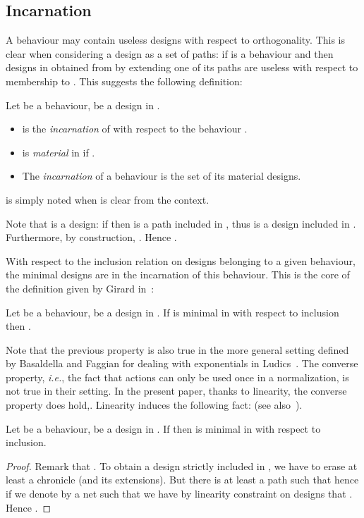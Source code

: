 \documentclass{LMCS}
\def\ie{{\em i.e.}}
\begin{document}
\subsection{Incarnation}

A behaviour may contain useless designs with respect to orthogonality. This is clear when considering a design as a set of paths:  if  is a behaviour and  then designs in  obtained from  by extending one of its paths are useless with respect to membership to . This suggests the following definition:

\begin{defi}[Incarnation]\label{incarnationdessein}
Let  be a behaviour,  be a design in . 
\begin{itemize}
\item  is the {\em incarnation} of  with respect to the behaviour . 
\item  is {\em material} in  if .
\item The {\em incarnation}  of a behaviour  is the  set of its material designs.
\end{itemize}
 is simply noted  when  is clear from the context.
\end{defi}

Note that  is a design: if  then 
 is a path included in , thus  is a design included in . 
Furthermore, by construction, . Hence .


 With respect to the inclusion relation on designs belonging to a given behaviour, the minimal designs are in the incarnation of this behaviour.
This is the core of the definition given by Girard in~\cite{DBLP:journals/mscs/Girard01}:
\begin{prop}
Let  be a behaviour,  be a design in .
If  is minimal in  with respect to inclusion then .
\end{prop}

Note that the previous property is also true in the more general setting defined by Basaldella and Faggian for dealing with exponentials in Ludics~\cite{DBLP:conf/lics/BasaldellaF09}. The converse property, \ie, the fact that actions can only be used once in a normalization, is not true in their setting. In the present paper, thanks to linearity, the converse property does hold,. Linearity induces the following fact:  (see also~\cite{DBLP:journals/mscs/Girard01}).

\begin{prop}
Let  be a behaviour,  be a design in .
If 
then  is minimal in  with respect to inclusion.
\end{prop}
\begin{proof}
Remark that .
To obtain a design  strictly included in , we have to erase at least a chronicle  (and its extensions). But there is at least a path  such that    hence if we denote by  a net such that  we have by linearity constraint on designs that . Hence .
\end{proof}
\end{document}

